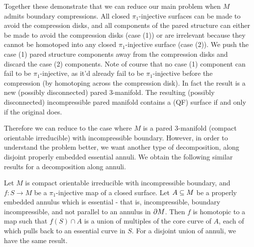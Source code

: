 Together these demonstrate that we can reduce our main problem when $M$ admits
boundary compressions. All closed $\pi_1$-injective surfaces can be made to
avoid the compression disks, and all components of the pared structure can
either be made to avoid the compression disks (case (1)) or are irrelevant
because they cannot be homotoped into any closed $\pi_1$-injective surface
(case (2)). We push the case (1) pared structure components away from the
compression disks and discard the case (2) components. Note of course that no
case (1) component can fail to be $\pi_1$-injective, as it'd already fail to be
$\pi_1$-injective before the compression (by homotoping across the compression
disk). In fact the result is a new (possibly disconnected) pared 3-manifold.
The resulting (possibly disconnected) incompressible pared manifold contains
a (QF) surface if and only if the original does.

Therefore we can reduce to the case where $M$ is a pared 3-manifold (compact
orientable irreducible) with incompressible boundary. However, in order to
understand the problem better, we want another type of decomposition, along
disjoint properly embedded essential annuli. We obtain the following similar
results for a decomposition along annuli.

\begin{prop}

Let $M$ is compact orientable irreducible with incompressible boundary, and $f
\colon S \to M$ be a $\pi_1$-injective map of a closed surface. Let $A \subseteq M$
be a properly embedded annulus which is essential - that is, incompressible,
boundary incompressible, and not parallel to an annulus in $\partial M$. Then $f$ is
homotopic to a map such that $f(S) \cap A$ is a union of multiples of the core
curve of $A$, each of which pulls back to an essential curve in $S$. For
a disjoint union of annuli, we have the same result.

\end{prop}

